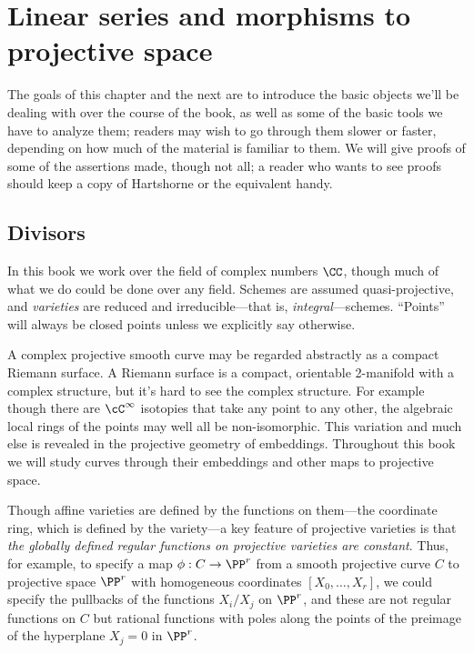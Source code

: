 

\chapter{Linear series and morphisms to projective space}\label{linear series}

The goals of this chapter and the next are to introduce the basic objects we'll be dealing with over the course of the book, as well as some of the basic tools we have to analyze them; readers may wish to go through them slower or faster, depending on how much of the material is familiar to them. We will give proofs of some of the assertions made, though not all; a reader who wants to see proofs should keep a copy of Hartshorne or the equivalent handy.


\section{Divisors}

In this book we work over the field of complex numbers $\CC$, though much of what we do
could be done over any field. 
Schemes are assumed quasi-projective, and \emph{varieties} are reduced and irreducible---that is, \emph{integral}---schemes. ``Points'' will always be closed points unless we explicitly say otherwise.

A complex projective smooth curve may  be regarded abstractly as a compact Riemann surface. A Riemann surface is a compact, orientable 2-manifold with a complex structure, but it's hard to see the complex structure. For example though there
are $\cC^\infty$ isotopies that take any point to any other, the algebraic local rings of the points may well all be non-isomorphic. This variation and much else is revealed in the projective geometry of embeddings. Throughout this book we will study curves through their embeddings and other maps to projective space. 

Though affine varieties are defined by the functions on them---the coordinate ring, which is defined by the variety---a key feature of projective varieties is that \emph{the globally defined regular functions on projective varieties are constant}. Thus, for example, to specify a map $\phi : C \to \PP^r$ from a smooth projective curve $C$ to projective space $\PP^r$ with homogeneous coordinates $[X_0,\dots,X_r]$, we could specify the pullbacks of the functions $X_i/X_j$ on $\PP^r$, and these are not regular functions on $C$ but rational functions with poles along the points of the preimage of the hyperplane $X_j = 0$ in $\PP^r$.

